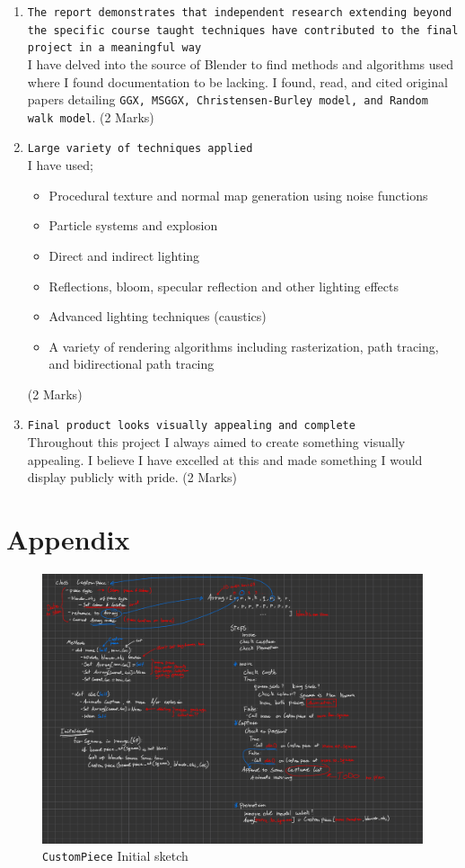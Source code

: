 \documentclass[11pt]{article}
\begin{document}
\begin{enumerate}
\item \texttt{The report demonstrates that independent research extending beyond the specific course taught techniques have contributed to the final project in a meaningful way}\\
I have delved into the source of Blender to find methods and algorithms used
where I found documentation to be lacking. I found, read, and cited original
papers detailing \texttt{GGX, MSGGX, Christensen-Burley model, and Random walk
   model}. (2 Marks)
\item \texttt{Large variety of techniques applied}\\
I have used;
\begin{itemize}
\item Procedural texture and normal map generation using noise functions
\item Particle systems and explosion
\item Direct and indirect lighting
\item Reflections, bloom, specular reflection and other lighting effects
\item Advanced lighting techniques (caustics)
\item A variety of rendering algorithms including rasterization, path tracing,
and bidirectional path tracing
\end{itemize}
(2 Marks)
\item \texttt{Final product looks visually appealing and complete}\\
Throughout this project I always aimed to create something visually appealing.
I believe I have excelled at this and made something I would display
publicly with pride. (2 Marks)
\end{enumerate}

\newpage
\section{Appendix}
\label{sec:org357c765}
\begin{figure}[htbp]
\centering
\includegraphics[width=\textwidth]{Scratchpad.pdf}
\caption{\label{class-sketch}\texttt{CustomPiece} Initial sketch}
\end{figure}
\end{document}
